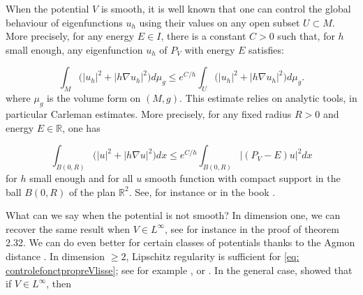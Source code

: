\documentclass[leqno,11pt,letterpaper, english]{amsart}
\theoremstyle{plain}
\theoremstyle{definition}
\numberwithin{equation}{section}
\def\R{\mathbb R}
\begin{document}

	When the potential $V$ is smooth, it is well known that one can control the global behaviour of eigenfunctions $u_h$ using their values on any open subset $U \subset M$. More precisely, for any energy $E \in I$, there is a constant $C>0$ such that, for $h$ small enough, any eigenfunction $u_h$ of $P_V$ with energy $E$ satisfies:


	\begin{equation}
		\label{eq: controlefonctpropreVlisse}
		\int_M \Big(|u_h|^2 + |h\nabla u_h|^2 \Big)d\mu_g \leq e^{C/h} \int_U \Big(|u_h|^2 + |h\nabla u_h|^2 \Big)d\mu_g.
	\end{equation}
	where $\mu_g$ is the volume form on $(M,g)$.
	 This estimate relies on analytic tools, in particular Carleman estimates. More precisely, for any fixed radius $R > 0$ and energy $E \in \R$, one has

	\begin{equation}
		\int_{B(0, R)} \Big(|u|^2 + |h\nabla u|^2 \Big)dx \leq  e^{C/h} \int_{B(0, R)} |(P_V - E)u|^2dx
	\end{equation}
	for  $h$ small enough and for all $u$ smooth function with compact support in the ball $B(0,R)$ of the plan $\R^2$. See, for instance \cite{lerousseauCarlemanEstimatesElliptic2012} or in the book \cite*{LeRousseau2022}.
	
What can we say when the potential is not smooth?
In dimension one, we can recover the same result when $V\in L^\infty$, see for instance \cite{dyatlovMathematicalTheoryScattering2019} in the proof of theorem 2.32. We can do even better for certain classes of potentials thanks to the Agmon distance  \citep{laurentUniformObservationSemiclassicalSchrodinger2023}.
	In dimension $\geq 2$, Lipschitz regularity is sufficient for \eqref{eq: controlefonctpropreVlisse}; see for example \cite{datchev2014quantitativelimitingabsorptionprinciple}, \cite{shapiro2017semiclassicalresolventboundsdimension} or \cite{dyatlovMathematicalTheoryScattering2019}. In the general case, \cite{kloppSemiclassicalResolventEstimates2019a} showed that if $V \in L^{\infty}$, then
\end{document}

